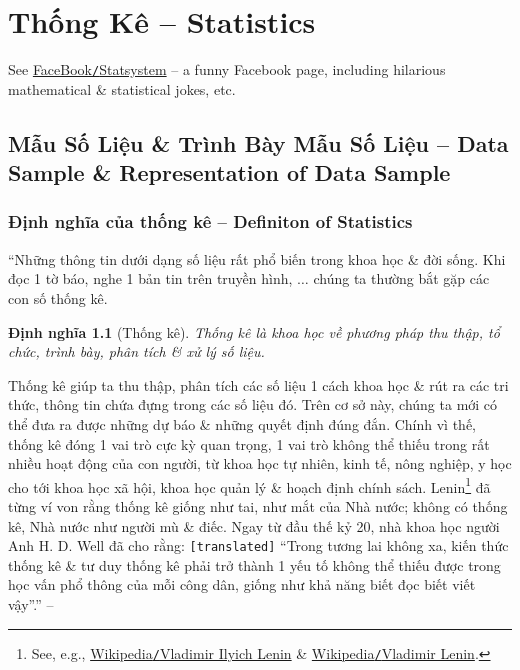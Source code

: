 \documentclass[oneside]{book}
\numberwithin{equation}{section}
\newtheorem{dinhnghia}{Định nghĩa}[section]
\begin{document}

\chapter{Thống Kê -- Statistics}

See \href{https://www.facebook.com/statsystem}{FaceBook\texttt{/}Statsystem} -- a funny Facebook page, including hilarious mathematical \& statistical jokes, etc.

\section{Mẫu Số Liệu \& Trình Bày Mẫu Số Liệu -- Data Sample \& Representation of Data Sample}

\subsection{Định nghĩa của thống kê -- Definiton of Statistics}
``Những thông tin dưới dạng số liệu rất phổ biến trong khoa học \& đời sống. Khi đọc 1 tờ báo, nghe 1 bản tin trên truyền hình, $\ldots$ chúng ta thường bắt gặp các con số thống kê.

\begin{dinhnghia}[Thống kê]
	\emph{Thống kê} là khoa học về phương pháp thu thập, tổ chức, trình bày, phân tích \& xử lý số liệu.
\end{dinhnghia}
Thống kê giúp ta thu thập, phân tích các số liệu 1 cách khoa học \& rút ra các tri thức, thông tin chứa đựng trong các số liệu đó. Trên cơ sở này, chúng ta mới có thể đưa ra được những dự báo \& những quyết định đúng đắn. Chính vì thế, thống kê đóng 1 vai trò cực kỳ quan trọng, 1 vai trò không thể thiếu trong rất nhiều hoạt động của con người, từ khoa học tự nhiên, kinh tế, nông nghiệp, y học cho tới khoa học xã hội, khoa học quản lý \& hoạch định chính sách. Lenin\footnote{See, e.g., \href{https://vi.wikipedia.org/wiki/Vladimir_Ilyich_Lenin}{Wikipedia\texttt{/}Vladimir Ilyich Lenin} \& \href{https://en.wikipedia.org/wiki/Vladimir_Lenin}{Wikipedia\texttt{/}Vladimir Lenin}.} đã từng ví von rằng thống kê giống như tai, như mắt của Nhà nước; không có thống kê, Nhà nước như người mù \& điếc. Ngay từ đầu thế kỷ 20, nhà khoa học người Anh H. D. Well đã cho rằng: \texttt{[translated]} ``Trong tương lai không xa, kiến thức thống kê \& tư duy thống kê phải trở thành 1 yếu tố không thể thiếu được trong học vấn phổ thông của mỗi công dân, giống như khả năng biết đọc biết viết vậy''.'' -- \cite[p. ]{TL_chuyen_Toan_Dai_So_Giai_Tich_11}
\end{document}
